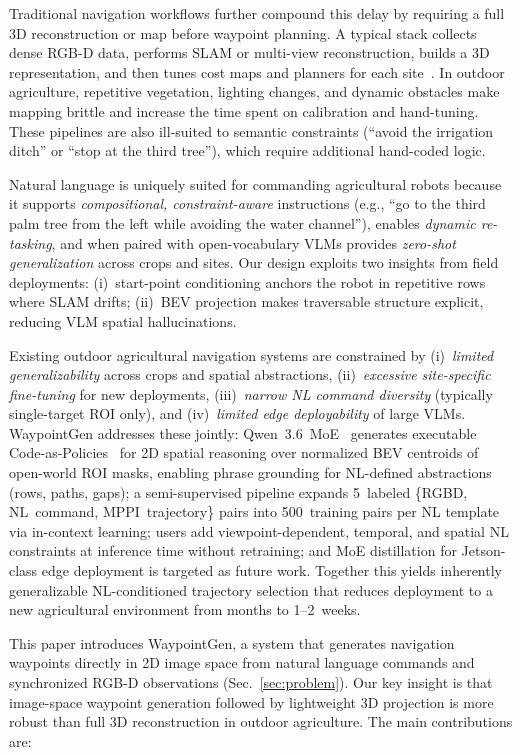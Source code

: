 \documentclass{article}
\begin{document}
Traditional navigation workflows further compound this delay by requiring a full 3D reconstruction or map before waypoint planning. A typical stack collects dense RGB-D data, performs SLAM or multi-view reconstruction, builds a 3D representation, and then tunes cost maps and planners for each site~\citep{campos2021orbslam3,pfrommer2019tagslam}. In outdoor agriculture, repetitive vegetation, lighting changes, and dynamic obstacles make mapping brittle and increase the time spent on calibration and hand-tuning. These pipelines are also ill-suited to semantic constraints (``avoid the irrigation ditch'' or ``stop at the third tree''), which require additional hand-coded logic.

Natural language is uniquely suited for commanding agricultural robots because it supports \emph{compositional, constraint-aware} instructions (e.g., ``go to the third palm tree from the left while avoiding the water channel''), enables \emph{dynamic re-tasking}, and when paired with open-vocabulary VLMs provides \emph{zero-shot generalization} across crops and sites. Our design exploits two insights from field deployments: (i)~start-point conditioning anchors the robot in repetitive rows where SLAM drifts; (ii)~BEV projection makes traversable structure explicit, reducing VLM spatial hallucinations.

Existing outdoor agricultural navigation systems are constrained by (i)~\emph{limited generalizability} across crops and spatial abstractions, (ii)~\emph{excessive site-specific fine-tuning} for new deployments, (iii)~\emph{narrow NL command diversity} (typically single-target ROI only), and (iv)~\emph{limited edge deployability} of large VLMs. WaypointGen addresses these jointly: Qwen~3.6~MoE~\citep{qwen2026qwen36} generates executable Code-as-Policies~\citep{liang2023code} for 2D spatial reasoning over normalized BEV centroids of open-world ROI masks, enabling phrase grounding for NL-defined abstractions (rows, paths, gaps); a semi-supervised pipeline expands 5~labeled \{RGBD, NL~command, MPPI~trajectory\} pairs into 500~training pairs per NL template via in-context learning; users add viewpoint-dependent, temporal, and spatial NL constraints at inference time without retraining; and MoE distillation for Jetson-class edge deployment is targeted as future work. Together this yields inherently generalizable NL-conditioned trajectory selection that reduces deployment to a new agricultural environment from months to 1--2~weeks.

This paper introduces WaypointGen, a system that generates navigation waypoints directly in 2D image space from natural language commands and synchronized RGB-D observations (Sec.~\ref{sec:problem}). Our key insight is that image-space waypoint generation followed by lightweight 3D projection is more robust than full 3D reconstruction in outdoor agriculture. The main contributions are:
\end{document}
